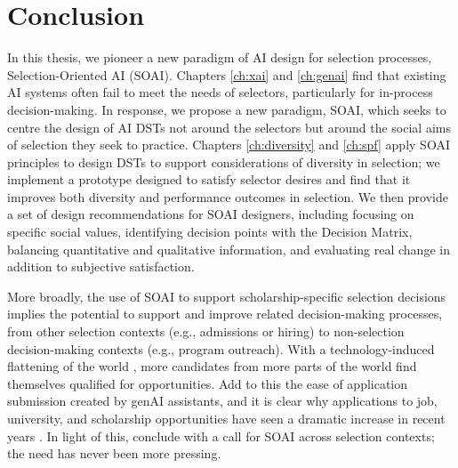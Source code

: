 \section{Conclusion}
In this thesis, we pioneer a new paradigm of AI design for selection processes, Selection-Oriented AI (SOAI). Chapters \ref{ch:xai} and \ref{ch:genai} find that existing AI systems often fail to meet the needs of selectors, particularly for in-process decision-making. In response, we propose a new paradigm, SOAI, which seeks to centre the design of AI DSTs not around the selectors but around the social aims of selection they seek to practice. Chapters \ref{ch:diversity} and \ref{ch:spf} apply SOAI principles to design DSTs to support considerations of diversity in selection; we implement a prototype designed to satisfy selector desires and find that it improves both diversity and performance outcomes in selection. We then provide a set of design recommendations for SOAI designers, including focusing on specific social values, identifying decision points with the Decision Matrix, balancing quantitative and qualitative information, and evaluating real change in addition to subjective satisfaction.

More broadly, the use of SOAI to support scholarship-specific selection decisions implies the potential to support and improve related decision-making processes, from other selection contexts (e.g., admissions or hiring) to non-selection decision-making contexts (e.g., program outreach). With a technology-induced flattening of the world \cite{Friedman_2005}, more candidates from more parts of the world find themselves qualified for opportunities. Add to this the ease of application submission created by genAI assistants, and it is clear why applications to job, university, and scholarship opportunities have seen a dramatic increase in recent years \cite{Kaashoek2024Impact}. In light of this, conclude with a call for SOAI across selection contexts; the need has never been more pressing.